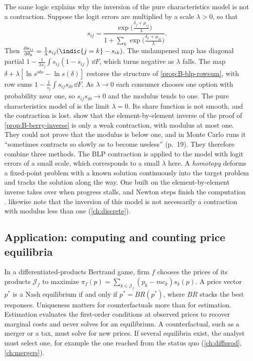 \begin{remark}\label{rem:B-scale}
The same logic explains why the inversion of the pure characteristics model is not a contraction. Suppose
the logit errors are multiplied by a scale $\lambda > 0$, so that
\begin{equation*}
  s_{ij} = \frac{\exp\big(\frac{\delta_j + \mu_{ij}}{\lambda}\big)}{1 + \sum_k\exp\big(\frac{\delta_k +
  \mu_{ik}}{\lambda}\big)}.
\end{equation*}
Then $\frac{\partial s_{ij}}{\partial\delta_k} = \frac{1}{\lambda}s_{ij}(\indic\{j = k\} -
s_{ik})$. The undampened map has diagonal partial $1 - \frac{1}{\lambda s_j}\int s_{ij}(1 - s_{ij})\,\dd F$,
which turns negative as $\lambda$ falls. The map $\delta + \lambda[\ln s^{obs} - \ln s(\delta)]$ restores the
structure of \cref{prop:B-blp-rowsum}, with row sums $1 - \frac{1}{s_j}\int s_{ij}s_{i0}\,\dd F$. As $\lambda
\to 0$ each consumer chooses one option with probability near one, so $s_{ij}s_{i0} \to 0$ and the modulus
tends to one. The pure characteristics model of \citet{BerryPakes2007} is the limit $\lambda = 0$. Its share
function is not smooth, and the contraction is lost. \citet[proof of Theorem~1, pp.~17--18]{BerryPakes2007}
show that the element-by-element inverse of the proof of \cref{prop:B-berry-inverse} is only a weak contraction,
with modulus at most one. They could not prove that the modulus is below one, and in Monte Carlo runs it
``sometimes contracts so slowly as to become useless'' (p.~19). They therefore combine three methods. The BLP
contraction is applied to the model with logit errors of a small scale, which corresponds to a small
$\lambda$ here. A \emph{homotopy} deforms a fixed-point problem with a known solution continuously into the
target problem and tracks the solution along the way. One built on the element-by-element inverse takes over
when progress stalls, and Newton steps finish the computation \citep[Section~4.3]{BerryPakes2007}. \citet[p.~35]{AckerbergEtAl2007} likewise note
that the inversion of this model is not necessarily a contraction with modulus less than one (\cref{ch:discrete}).
\end{remark}

\subsection{Application: computing and counting price equilibria}\label{sec:B-equilibrium}

In a differentiated-products Bertrand game, firm $f$ chooses the prices of its products $\mathcal{J}_f$ to
maximize $\pi_f(p) = \sum_{k \in \mathcal{J}_f}(p_k - mc_k)s_k(p)$. A price vector $p^*$ is a Nash
equilibrium if and only if $p^* = BR(p^*)$, where $BR$ stacks the best responses. Uniqueness matters for
counterfactuals more than for estimation. Estimation evaluates the first-order conditions at observed prices
to recover marginal costs and never solves for an equilibrium. A counterfactual, such as a merger or a tax,
must solve for new prices. If several equilibria exist, the analyst must select one, for example the one
reached from the status quo (\cref{ch:diffprod}, \cref{ch:mergers}).

